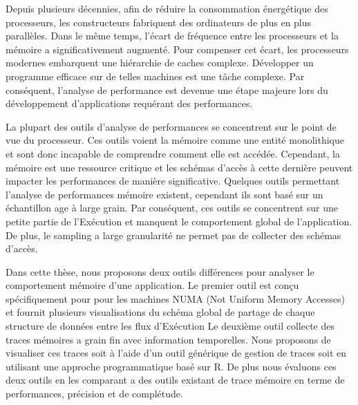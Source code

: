 
Depuis plusieurs décennies, afin de réduire la consommation énergétique des processeurs, les constructeurs fabriquent des ordinateurs de plus en plus parallèles.
Dans le même temps, l'écart de fréquence entre les processeurs et la mémoire a significativement augmenté.
Pour compenser cet écart, les processeurs modernes embarquent une hiérarchie de caches complexe.
Développer un programme efficace sur de telles machines est une t\^ache complexe.
Par conséquent, l'analyse de performance est devenue une étape majeure lors du développement d'applications requérant des performances.

La plupart des outils d'analyse de performances se concentrent sur le point de vue du processeur.
Ces outils voient la mémoire comme une entité monolithique et sont donc incapable de comprendre comment elle est accédée.
Cependant, la mémoire est une ressource critique et les schémas d'accès à cette dernière peuvent impacter les performances de manière significative.
Quelques outils permettant l'analyse de performances mémoire existent, cependant ils sont basé sur un échantillon age à large grain.
Par conséquent, ces outils se concentrent sur une petite partie de l’Exécution et manquent le comportement global de l'application.
De plus, le sampling a large granularité ne permet pas de collecter des schémas d'accès.

Dans cette thèse, nous proposons deux outils différences pour analyser le comportement mémoire d'une application.
Le premier outil est conçu spécifiquement pour pour les machines NUMA (Not Uniform Memory Accesses) et fournit plusieurs visualisations  du schéma global de partage de chaque structure de données entre les flux d’Exécution
Le deuxième outil collecte des traces mémoires a grain fin avec information temporelles.
Nous proposons de visualiser ces traces soit à l'aide d'un outil générique de gestion de traces soit en utilisant une approche programmatique basé sur R.
De plus nous évaluons ces deux outils en les comparant a des outils existant de trace mémoire en terme de performances, précision et de complétude.

\glsresetall

